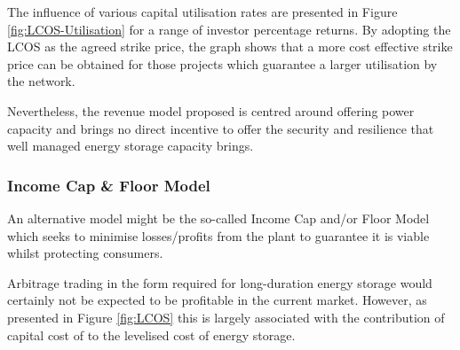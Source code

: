 \documentclass[preprint,12pt]{elsarticle}
\begin{document}
The influence of various capital utilisation rates are presented in Figure \ref{fig:LCOS-Utilisation} for a range of investor percentage returns. By adopting the LCOS as the agreed strike price, the graph shows that a more cost effective strike price can be obtained for those projects which guarantee a larger utilisation by the network.

Nevertheless, the revenue model proposed is centred around offering power capacity and brings no direct incentive to offer the security and resilience that well managed energy storage capacity brings. 





\subsubsection{Income Cap \& Floor Model} 
An alternative model might be the so-called Income Cap and/or Floor Model which seeks to minimise losses/profits from the plant to guarantee it is viable whilst protecting consumers. 

Arbitrage trading in the form required for long-duration energy storage would certainly not be expected to be profitable in the current market. However, as presented in Figure \ref{fig:LCOS} this is largely associated with the contribution of capital cost of to the levelised cost of energy storage. 
\end{document}

